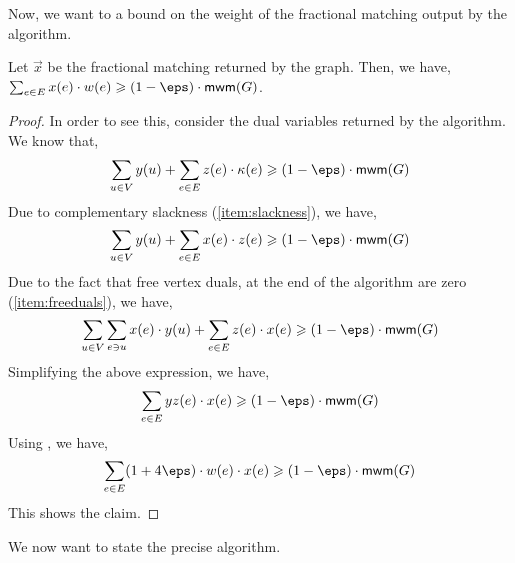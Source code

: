 Now, we want to a bound on the weight of the fractional matching output by the algorithm. 

\begin{claim2}
Let $\vec{x}$ be the fractional matching returned by the graph. Then, we have, $\sum_{e\in E}x(e)\cdot w(e)\geqslant (1-\eps)\cdot \textsf{mwm}(G)$.
\end{claim2}
\begin{proof}
In order to see this, consider the dual variables returned by the algorithm. We know that,
\begin{align*}
\sum_{u\in V}y(u)+\sum_{e\in E}z(e)\cdot \kappa(e)\geqslant (1-\eps)\cdot \textsf{mwm}(G)
\end{align*}
Due to complementary slackness (\ref{item:slackness}), we have,
\begin{align*}
\sum_{u\in V} y(u)+\sum_{e\in E} x(e)\cdot z(e)\geqslant (1-\eps)\cdot \textsf{mwm}(G)
\end{align*}
Due to the fact that free vertex duals, at the end of the algorithm are zero (\ref{item:freeduals}), we have,
\begin{align*}
\sum_{u\in V} \sum_{e\ni u} x(e)\cdot y(u)+\sum_{e\in E} z(e)\cdot x(e)\geqslant (1-\eps)\cdot \textsf{mwm}(G)
\end{align*}
Simplifying the above expression, we have,
\begin{align*}
\sum_{e\in E} yz(e)\cdot x(e)\geqslant (1-\eps)\cdot \textsf{mwm}(G)
\end{align*}
Using , we have, 
\begin{align*}
\sum_{e\in E} (1+4\eps)\cdot w(e)\cdot x(e)\geqslant (1-\eps)\cdot \textsf{mwm}(G)
\end{align*}
This shows the claim. 
\end{proof}
We now want to state the precise algorithm.
